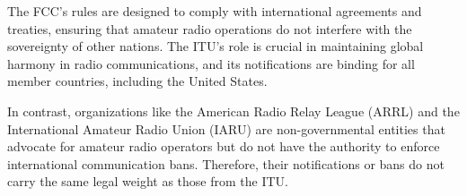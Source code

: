The FCC's rules are designed to comply with international agreements and treaties, ensuring that amateur radio operations do not interfere with the sovereignty of other nations. The ITU's role is crucial in maintaining global harmony in radio communications, and its notifications are binding for all member countries, including the United States.

In contrast, organizations like the American Radio Relay League (ARRL) and the International Amateur Radio Union (IARU) are non-governmental entities that advocate for amateur radio operators but do not have the authority to enforce international communication bans. Therefore, their notifications or bans do not carry the same legal weight as those from the ITU.

